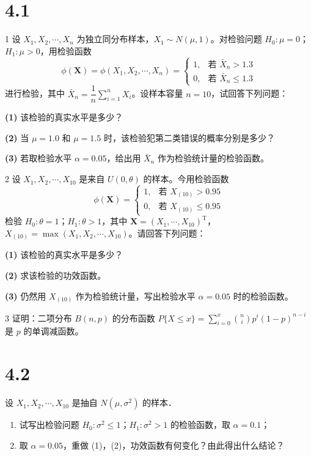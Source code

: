 \section{4.1}
\begin{homework}{1}
设 $X_1, X_2, \cdots, X_n$ 为独立同分布样本，$X_1 \sim N(\mu, 1)$。对检验问题 $H_0: \mu = 0$；$H_1: \mu > 0$，用检验函数
$$\phi(\boldsymbol{X}) = \phi(X_1, X_2, \cdots, X_n) = \begin{cases} 1, & \text{若 } \bar{X}_n > 1.3 \\ 0, & \text{若 } \bar{X}_n \leq 1.3 \end{cases}$$
进行检验，其中 $\bar{X}_n = \dfrac{1}{n}\displaystyle\sum_{i=1}^n X_i$。设样本容量 $n = 10$，试回答下列问题：

\textbf{(1)} 该检验的真实水平是多少？

\textbf{(2)} 当 $\mu = 1.0$ 和 $\mu = 1.5$ 时，该检验犯第二类错误的概率分别是多少？

\textbf{(3)} 若取检验水平 $\alpha = 0.05$，给出用 $\bar{X}_n$ 作为检验统计量的检验函数。
\end{homework}

\begin{homework}{2}
设 $X_1, X_2, \cdots, X_{10}$ 是来自 $U(0, \theta)$ 的样本。今用检验函数
$$\phi(\boldsymbol{X}) = \begin{cases} 1, & \text{若 } X_{(10)} > 0.95 \\ 0, & \text{若 } X_{(10)} \leq 0.95 \end{cases}$$
检验 $H_0: \theta = 1$；$H_1: \theta > 1$，其中 $\boldsymbol{X} = (X_1, \cdots, X_{10})^\mathrm{T}$，$X_{(10)} = \max(X_1, X_2, \cdots, X_{10})$。请回答下列问题：

\textbf{(1)} 该检验的真实水平是多少？

\textbf{(2)} 求该检验的功效函数。

\textbf{(3)} 仍然用 $X_{(10)}$ 作为检验统计量，写出检验水平 $\alpha = 0.05$ 时的检验函数。
\end{homework}

\begin{homework}{3}
证明：二项分布 $B(n,p)$ 的分布函数 $P\{X \leq x\} = \displaystyle\sum_{i=0}^{x}\binom{n}{i}p^i(1-p)^{n-i}$ 是 $p$ 的单调减函数。
\end{homework}
\section{4.2}
\begin{homework}[2]
设 $X_1, X_2, \cdots, X_{10}$ 是抽自 $N(\mu, \sigma^2)$ 的样本．

\begin{enumerate}
   

    \item[(2)] 试写出检验问题 $H_0: \sigma^2 \leqslant 1$；$H_1: \sigma^2 > 1$ 的检验函数，取 $\alpha = 0.1$；

    \item[(3)] 取 $\alpha = 0.05$，重做 (1)，(2)，功效函数有何变化？由此得出什么结论？
\end{enumerate}
\end{homework}

